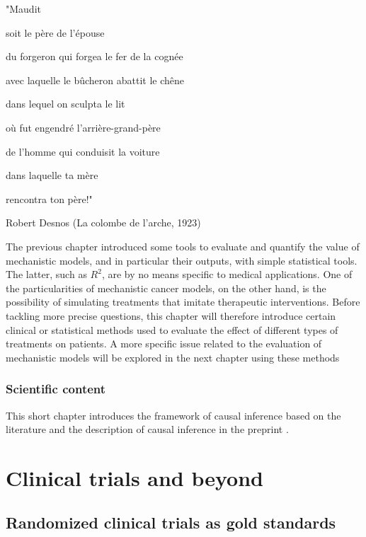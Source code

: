 \documentclass[a4paper,12pt,twoside,onecolumn,openright,final,oldfontcommands]{memoir}
\newcommand{\initial}[1]{
	\lettrine[lines=3,lhang=0.33,nindent=0em]{
		\color{gray}
     		{\textsc{#1}}}{}}
\let\BeginKnitrBlock\begin \let\EndKnitrBlock\end
\begin{document}
\epigraph{"Maudit

soit le père de l'épouse

du forgeron qui forgea le fer de la cognée

avec laquelle le bûcheron abattit le chêne

dans lequel on sculpta le lit

où fut engendré l'arrière-grand-père

de l'homme qui conduisit la voiture

dans laquelle ta mère

rencontra ton père!"}{Robert Desnos (La colombe de l'arche, 1923)}

\initial{T}he previous chapter introduced some tools to evaluate and
quantify the value of mechanistic models, and in particular their
outputs, with simple statistical tools. The latter, such as \(R^2\), are
by no means specific to medical applications. One of the particularities
of mechanistic cancer models, on the other hand, is the possibility of
simulating treatments that imitate therapeutic interventions. Before
tackling more precise questions, this chapter will therefore introduce
certain clinical or statistical methods used to evaluate the effect of
different types of treatments on patients. A more specific issue related
to the evaluation of mechanistic models will be explored in the next
chapter using these methods

\BeginKnitrBlock{summarybox}
\subsubsection*{Scientific content}\label{scientific-content-5}

This short chapter introduces the framework of causal inference based on
the literature and the description of causal inference in the preprint
\citet{beal2020causal}.
\EndKnitrBlock{summarybox}

\newcommand{\indep}{\perp \!\!\! \perp}

\section{Clinical trials and beyond}\label{clinical-trials-and-beyond}

\subsection{Randomized clinical trials as gold
standards}\label{randomized-clinical-trials-as-gold-standards}
\end{document}
